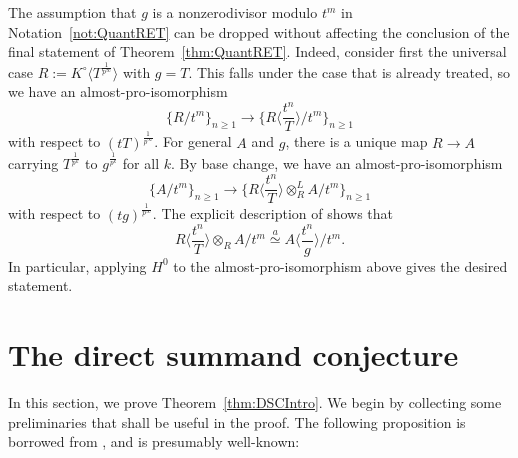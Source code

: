 \documentclass[10pt,reqno]{amsart}
\begin{document}
\begin{remark}
\label{rmk:RETnzd}
The assumption that $g$ is a nonzerodivisor modulo $t^m$ in Notation~\ref{not:QuantRET} can be dropped without affecting the conclusion of the final statement of Theorem~\ref{thm:QuantRET}. Indeed, consider first the universal case $R := K^\circ \langle T^{\frac{1}{p^\infty}} \rangle$ with $g=T$. This falls under the case that is already treated, so we have an almost-pro-isomorphism
\[ \{R/t^m\}_{n \geq 1} \to \{R \langle \frac{t^n}{T} \rangle/t^m\}_{n \geq 1}\]
with respect to $(tT)^{\frac{1}{p^\infty}}$. For general $A$ and $g$, there is a unique map $R \to A$ carrying $T^{\frac{1}{p^k}}$ to $g^{\frac{1}{p^k}}$ for all $k$. By base change, we have an almost-pro-isomorphism
\[ \{A/t^m\}_{n \geq 1} \to \{R \langle \frac{t^n}{T} \rangle \otimes^L_R A/t^m\}_{n \geq 1}\]
with respect to $(tg)^{\frac{1}{p^\infty}}$. The explicit description of \cite[Lemma 6.4]{ScholzePerfectoidSpaces} shows that
\[R \langle \frac{t^n}{T} \rangle \otimes_R A/t^m \stackrel{a}{\simeq} A\langle \frac{t^n}{g} \rangle/t^m.\]
In particular, applying $H^0$ to the almost-pro-isomorphism above gives the desired statement.
\end{remark}





\section{The direct summand conjecture}
\label{sec:DSC}

In this section, we prove Theorem~\ref{thm:DSCIntro}. We begin by collecting some preliminaries that shall be useful in the proof. The following proposition is borrowed from \cite[Lemma 4.30 and Remark 4.31]{BhattMorrowScholze}, and is presumably well-known:
\end{document}
